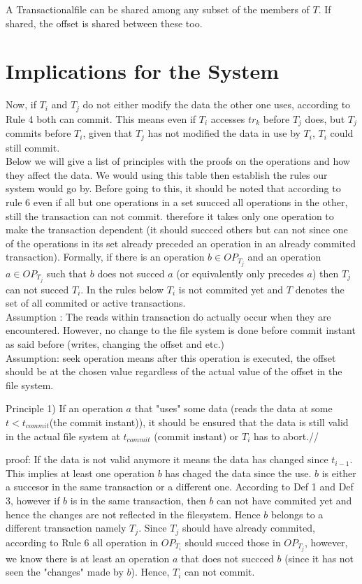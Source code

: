 \documentclass[a4paper, 11pt]{article}
\begin{document}
A Transactionalfile can be shared among any subset of the members of $T$. If shared, the offset is shared between these too. 

\section{Implications for the System}
Now, if $T_i$ and $T_j$ do not either modify the data the other one uses, according to Rule 4 both can commit. This means even if $T_i$ accesses $tr_k$ before $T_j$ does, but $T_j$ commits before $T_i$, given that $T_j$ has not modified the data in use by $T_i$, $T_i$ could still commit. \\


Below we will give a list of principles with the proofs on the operations and how they affect the data. We would using this table then establish the rules our system would go by. Before going to this, it should be noted that according to rule 6 even if all but one operations in a set suucced all operations in the other, still the transaction can not commit. therefore it takes only one operation to make the transaction dependent (it should succced others but can not since one of the operations in its set already preceded an operation in an already commited transaction). Formally, if there is an operation $b \in OP_{T_j}$ and an operation $a \in OP_{T_j}$ such that $b$ does not succed $a$ (or equivalently only precedes $a$) then $T_j$ can not succed $T_i$. In the rules below $T_i$ is not commited yet and $T$ denotes the set of all commited or active transactions. \\

Assumption : The reads within transaction do actually occur when they are encountered. However, no change to the file system is done before commit instant as said before (writes, changing the offset and etc.)\\


Assumption: seek operation means after this operation is executed, the offset should be at the chosen value regardless of the actual value of the offset in the file system.


Principle 1) If an operation $a$ that "uses" some data (reads the data at some $t < t_{commit}$(the commit instant)), it should be ensured that the data is still valid in the actual file system at $t_{commit}$ (commit instant) or $T_i$ has to abort.//

proof: If the data is not valid anymore it means the data has changed since $t_{i-1}$. This implies at least one operation $b$ has chaged the data since the use. $b$ is either a succesor in the same transaction or a different one. According to Def 1 and Def 3, however if $b$ is in the same transaction, then $b$ can not have commited yet and hence the changes are not reflected in the filesystem. Hence $b$ belongs to a different transaction namely $T_j$. Since $T_j$ should have already commited, according to Rule 6 all operation in $OP_{T_i}$ should succed those in $OP_{T_j}$, however, we know there is at least an operation $a$ that does not succced $b$ (since it has not seen the "changes" made by $b$). Hence, $T_i$ can not commit.\\
\end{document}
